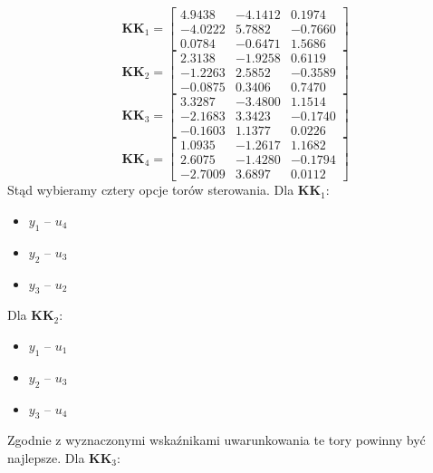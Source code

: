 \begin{equation}
  \bm{KK}_1 =
  \begin{bmatrix}
   \num{ 4.9438} &  \num{-4.1412}  & \num{ 0.1974} \\
   \num{-4.0222}  & \num{ 5.7882}  & \num{-0.7660} \\
   \num{ 0.0784} &  \num{-0.6471} &  \num{ 1.5686}
  \end{bmatrix}
\end{equation}
\begin{equation}
  \bm{KK}_2 =
  \begin{bmatrix}
   \num{ 2.3138} &  \num{-1.9258}  & \num{ 0.6119} \\
   \num{-1.2263}   & \num{ 2.5852}  & \num{-0.3589} \\
   \num{-0.0875}   &\num{ 0.3406} &  \num{ 0.7470}
  \end{bmatrix}
\end{equation}
\begin{equation}
  \bm{KK}_3 =
  \begin{bmatrix}
   \num{ 3.3287} &  \num{-3.4800}  & \num{ 1.1514} \\
   \num{-2.1683}  & \num{ 3.3423} &  \num{-0.1740} \\
   \num{-0.1603}  & \num{ 1.1377}  & \num{ 0.0226}
  \end{bmatrix}
\end{equation}
\begin{equation}
  \bm{KK}_4 =
  \begin{bmatrix}
   \num{ 1.0935}  & \num{-1.2617}  & \num{ 1.1682} \\
   \num{ 2.6075} &  \num{-1.4280}  & \num{-0.1794} \\
   \num{-2.7009}  & \num{ 3.6897} &  \num{ 0.0112}
  \end{bmatrix}
\end{equation}
Stąd wybieramy cztery opcje torów sterowania. Dla $\bm{KK}_1$:
\begin{itemize}
  \item $y_1$ -- $u_4$
 \item $y_2$ -- $u_3$
 \item $y_3$ -- $u_2$
\end{itemize}
 Dla $\bm{KK}_2$:
\begin{itemize}
  \item $y_1$ -- $u_1$
 \item $y_2$ -- $u_3$
 \item $y_3$ -- $u_4$
\end{itemize}
Zgodnie z wyznaczonymi wskaźnikami uwarunkowania te tory powinny być najlepsze. Dla $\bm{KK}_3$:
